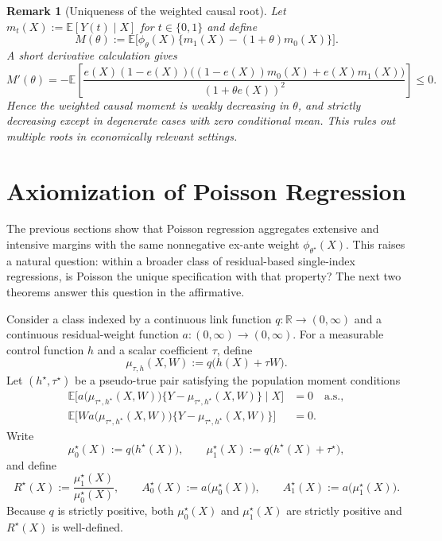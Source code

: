\documentclass[11pt]{article}
\newtheorem{remark}[theorem]{Remark}
\newcommand{\E}{\mathbb{E}}
\newcommand{\1}{\mathbf{1}}
\newcommand{\R}{\mathbb{R}}
\begin{document}
\begin{remark}[Uniqueness of the weighted causal root]
Let $m_t(X):=\E[Y(t)\mid X]$ for $t\in\{0,1\}$ and define
\[
M(\theta):=\E\Big[\phi_\theta(X)\{m_1(X)-(1+\theta)m_0(X)\}\Big].
\]
A short derivative calculation gives
\[
M'(\theta)
=
-\E\left[
\frac{e(X)(1-e(X))\big((1-e(X))m_0(X)+e(X)m_1(X)\big)}{(1+\theta e(X))^2}
\right]\le 0.
\]
Hence the weighted causal moment is weakly decreasing in $\theta$, and strictly decreasing except in degenerate cases with zero conditional mean. This rules out multiple roots in economically relevant settings.
\end{remark}


\section{Axiomization of Poisson Regression}

The previous sections show that Poisson regression aggregates extensive and intensive margins with the same nonnegative ex-ante weight $\phi_{\theta^\star}(X)$. This raises a natural question: within a broader class of residual-based single-index regressions, is Poisson the unique specification with that property? The next two theorems answer this question in the affirmative.

Consider a class indexed by a continuous link function $q:\R\to(0,\infty)$ and a continuous residual-weight function $a:(0,\infty)\to(0,\infty)$. For a measurable control function $h$ and a scalar coefficient $\tau$, define
\begin{equation}
\mu_{\tau,h}(X,W):=q\big(h(X)+\tau W\big).
\label{eq:genericmean}
\end{equation}
Let $(h^\star,\tau^\star)$ be a pseudo-true pair satisfying the population moment conditions
\begin{align}
\E\Big[a\big(\mu_{\tau^\star,h^\star}(X,W)\big)\big\{Y-\mu_{\tau^\star,h^\star}(X,W)\big\}\mid X\Big] &= 0 \quad \text{a.s.},
\label{eq:genericcondFOC}
\\
\E\Big[W a\big(\mu_{\tau^\star,h^\star}(X,W)\big)\big\{Y-\mu_{\tau^\star,h^\star}(X,W)\big\}\Big] &= 0.
\label{eq:generictreatFOC}
\end{align}
Write
\begin{equation}
\mu_0^\star(X):=q\big(h^\star(X)\big),
\qquad
\mu_1^\star(X):=q\big(h^\star(X)+\tau^\star\big),
\label{eq:genericmeans01}
\end{equation}
and define
\begin{equation}
R^\star(X):=\frac{\mu_1^\star(X)}{\mu_0^\star(X)},
\qquad
A_0^\star(X):=a\big(\mu_0^\star(X)\big),
\qquad
A_1^\star(X):=a\big(\mu_1^\star(X)\big).
\label{eq:genericRA}
\end{equation}
Because $q$ is strictly positive, both $\mu_0^\star(X)$ and $\mu_1^\star(X)$ are strictly positive and $R^\star(X)$ is well-defined.
\end{document}
